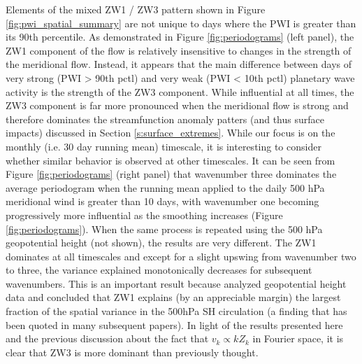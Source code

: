 Elements of the mixed ZW1 / ZW3 pattern shown in Figure \ref{fig:pwi_spatial_summary} are not unique to days where the PWI is greater than its 90th percentile. As demonstrated in Figure \ref{fig:periodograms} (left panel), the ZW1 component of the flow is relatively insensitive to changes in the strength of the meridional flow. Instead, it appears that the main difference between days of very strong (PWI > 90th pctl) and very weak (PWI < 10th pctl) planetary wave activity is the strength of the ZW3 component. While influential at all times, the ZW3 component is far more pronounced when the meridional flow is strong and therefore dominates the streamfunction anomaly patters (and thus surface impacts) discussed in Section \ref{s:surface_extremes}.     
While our focus is on the monthly (i.e. 30 day running mean) timescale, it is interesting to consider whether similar behavior is observed at other timescales. It can be seen from Figure \ref{fig:periodograms} (right panel) that wavenumber three dominates the average periodogram when the running mean applied to the daily 500 hPa meridional wind is greater than 10 days, with wavenumber one becoming progressively more influential as the smoothing increases (Figure \ref{fig:periodograms}). When the same process is repeated using the 500 hPa geopotential height (not shown), the results are very different. The ZW1 dominates at all timescales and except for a slight upswing from wavenumber two to three, the variance explained monotonically decreases for subsequent wavenumbers. This is an important result because \citet{vanLoon1972} analyzed geopotential height data and concluded that ZW1 explains (by an appreciable margin) the largest fraction of the spatial variance in the 500hPa SH circulation (a finding that has been quoted in many subsequent papers). In light of the results presented here and the previous discussion about the fact that $v_k \propto k Z_k$ in Fourier space, it is clear that ZW3 is more dominant than previously thought. 